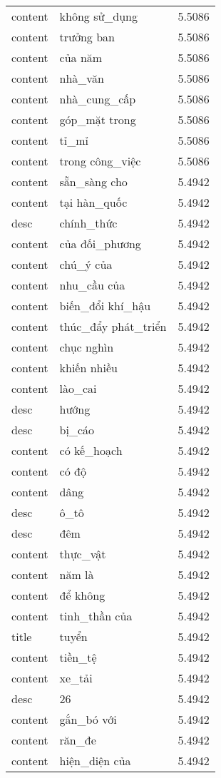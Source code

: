 \documentclass{article}
\begin{document}
\begin{tabular}{lll}
content & không sử\_dụng & 5.5086\\
content & trưởng ban & 5.5086\\
content & của năm & 5.5086\\
content & nhà\_văn & 5.5086\\
content & nhà\_cung\_cấp & 5.5086\\
content & góp\_mặt trong & 5.5086\\
content & tỉ\_mỉ & 5.5086\\
content & trong công\_việc & 5.5086\\
content & sẵn\_sàng cho & 5.4942\\
content & tại hàn\_quốc & 5.4942\\
desc & chính\_thức & 5.4942\\
content & của đối\_phương & 5.4942\\
content & chú\_ý của & 5.4942\\
content & nhu\_cầu của & 5.4942\\
content & biến\_đổi khí\_hậu & 5.4942\\
content & thúc\_đẩy phát\_triển & 5.4942\\
content & chục nghìn & 5.4942\\
content & khiến nhiều & 5.4942\\
content & lào\_cai & 5.4942\\
desc & hướng & 5.4942\\
desc & bị\_cáo & 5.4942\\
content & có kế\_hoạch & 5.4942\\
content & có độ & 5.4942\\
content & dâng & 5.4942\\
desc & ô\_tô & 5.4942\\
desc & đêm & 5.4942\\
content & thực\_vật & 5.4942\\
content & năm là & 5.4942\\
content & để không & 5.4942\\
content & tinh\_thần của & 5.4942\\
title & tuyển & 5.4942\\
content & tiền\_tệ & 5.4942\\
content & xe\_tải & 5.4942\\
desc & 26 & 5.4942\\
content & gắn\_bó với & 5.4942\\
content & răn\_đe & 5.4942\\
content & hiện\_diện của & 5.4942\\

\end{tabular}
\end{document}
